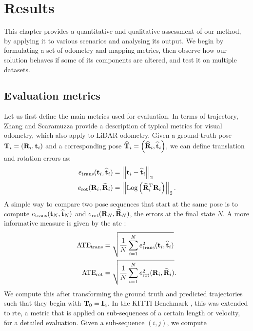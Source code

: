 \chapter{Results}
\label{ch:results}

This chapter provides a quantitative and qualitative assessment of our method, by applying it to various scenarios and analysing its output. We begin by formulating a set of odometry and mapping metrics, then observe how our solution behaves if some of its components are altered, and test it on multiple datasets.

\section{Evaluation metrics}
Let us first define the main metrics used for evaluation. In terms of trajectory, Zhang and Scaramuzza \cite{zhang2018tutorial} provide a description of typical metrics for visual odometry, which also apply to LiDAR odometry. Given a ground-truth pose
$\mathbf{T}_i = \left( \mathbf{R}_i, \mathbf{t}_i\right)$ and a corresponding pose
$\widehat{\mathbf{T}}_i = \left( \widehat{\mathbf{R}}_i, \widehat{\mathbf{t}}_i\right)$, we can define translation and rotation errors as:
\begin{equation}
    \begin{aligned}
        e_{\text{trans}}(\mathbf{t}_i, \widehat{\mathbf{t}}_i) & = \left|\left|{\mathbf{t}_i- \widehat{\mathbf{t}}_i}\right|\right|_2 \\
        e_{\text{rot}}(\mathbf{R}_i, \widehat{\mathbf{R}}_i )  & = \left|\left|{
            \text{Log}\left({{\widehat{\mathbf{R}}_i}^\text{T} \mathbf{R}_i}\right)
        }\right|\right|_2
        \text{.}
    \end{aligned}
\end{equation}
A simple way to compare two pose sequences that start at the same pose is to compute $e_{\text{trans}}(\mathbf{t}_N, \widehat{\mathbf{t}}_N)$ and $e_{\text{rot}}(\mathbf{R}_N, \widehat{\mathbf{R}}_N)$, the errors at the final state $N$. A more informative measure is given by the \acrfull{ate} \cite{kummerle2009measuring}:
\begin{equation}
    \begin{aligned}
        \text{ATE}_{\text{trans}} & = \sqrt{\frac{1}{N}\sum_{i=1}^{N} e_{\text{trans}}^2(\mathbf{t}_i, \widehat{\mathbf{t}}_i)} \\
        \text{ATE}_{\text{rot}}   & = \sqrt{\frac{1}{N}\sum_{i=1}^{N} e_{\text{rot}}^2(\mathbf{R}_i, \widehat{\mathbf{R}}_i )}
        \text{.}
    \end{aligned}
\end{equation}
We compute this after transforming the ground truth and predicted trajectories such that they begin with $\mathbf{T}_0 = \mathbf{I}_4$. In the KITTI Benchmark \cite{geiger2012kitti}, this was extended to \acrfull{rte}, a metric that is applied on sub-sequences of a certain length or velocity, for a detailed evaluation. Given a sub-sequence $(i,j)$, we compute
